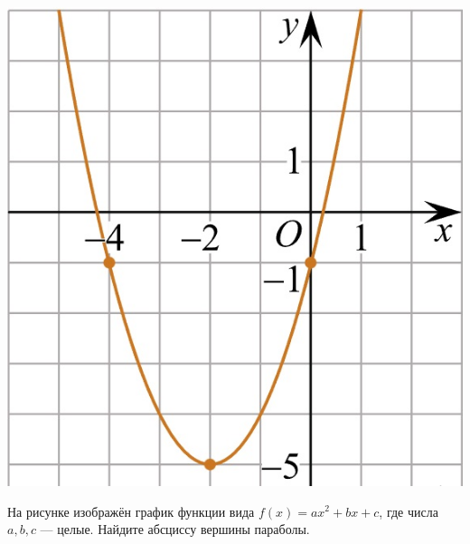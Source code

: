 \begin{class}[number=4]
\begin{listofex}
\begin{minipage}[c]{0.25\textwidth}
			\includegraphics[align=t, width=\textwidth]{pics/G101M4C4-4.jpg}
		\end{minipage}
		\item
		\begin{minipage}[t]{0.67\textwidth}
			На рисунке изображён график функции вида \(f(x)=ax^2+bx+c\), где числа \(a, b, c\) --- целые. Найдите абсциссу вершины параболы.
		\end{minipage}
		\begin{minipage}[c]{0.25\textwidth}

\end{minipage}
\end{listofex}
\end{class}
